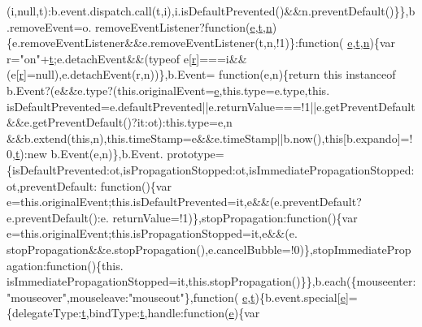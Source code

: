 \begin{DoxyCode}
{{      (i,null,t):b.event.dispatch.call(t,i),i.isDefaultPrevented()&&n.preventDefault()\}\},b.removeEvent=o.
      removeEventListener?\textcolor{keyword}{function}(\hyperlink{jquery-1_89_81_8min_8js_a2c038346d47955cbe2cb91e338edd7e1}{e},\hyperlink{jquery-1_89_81_8min_8js_a23c5666e83bbbceee94adcd0851f50c4}{t},\hyperlink{root_2static_2root_2js_2bootstrap_2jquery-ui-1_810_84_8custom_8min_8js_afc984c4f6c68ce30a0af99006f5f8d27}{n})\{e.removeEventListener&&e.removeEventListener(t,n,!1)\}:\textcolor{keyword}{function}(
      \hyperlink{jquery-1_89_81_8min_8js_a2c038346d47955cbe2cb91e338edd7e1}{e},\hyperlink{jquery-1_89_81_8min_8js_a23c5666e83bbbceee94adcd0851f50c4}{t},\hyperlink{root_2static_2root_2js_2bootstrap_2jquery-ui-1_810_84_8custom_8min_8js_afc984c4f6c68ce30a0af99006f5f8d27}{n})\{var r=\textcolor{stringliteral}{"on"}+\hyperlink{jquery-1_89_81_8min_8js_a23c5666e83bbbceee94adcd0851f50c4}{t};e.detachEvent&&(typeof e[\hyperlink{prism_8js_a514f1b439f404f86f77090fa9edc96ce}{r}]===i&&(e[\hyperlink{prism_8js_a514f1b439f404f86f77090fa9edc96ce}{r}]=null),e.detachEvent(r,n))\},b.Event=\textcolor{keyword}{
      function}(e,n)\{\textcolor{keywordflow}{return} \textcolor{keyword}{this} instanceof b.Event?(e&&e.type?(this.originalEvent=\hyperlink{jquery-1_89_81_8min_8js_a2c038346d47955cbe2cb91e338edd7e1}{e},this.type=e.type,this.
      isDefaultPrevented=e.defaultPrevented||e.returnValue===!1||e.getPreventDefault&&e.getPreventDefault()?it:ot):this.type=e,n
      &&b.extend(\textcolor{keyword}{this},n),this.timeStamp=e&&e.timeStamp||b.now(),\textcolor{keyword}{this}[b.expando]=!0,\hyperlink{jquery-1_89_81_8min_8js_a23c5666e83bbbceee94adcd0851f50c4}{t}):\textcolor{keyword}{new} b.Event(e,n)\},b.Event.
      prototype=\{isDefaultPrevented:ot,isPropagationStopped:ot,isImmediatePropagationStopped:ot,preventDefault:\textcolor{keyword}{
      function}()\{var e=this.originalEvent;this.isDefaultPrevented=it,e&&(e.preventDefault?e.preventDefault():e.
      returnValue=!1)\},stopPropagation:\textcolor{keyword}{function}()\{var e=this.originalEvent;this.isPropagationStopped=it,e&&(e.
      stopPropagation&&e.stopPropagation(),e.cancelBubble=!0)\},stopImmediatePropagation:\textcolor{keyword}{function}()\{this.
      isImmediatePropagationStopped=it,this.stopPropagation()\}\},b.each(\{mouseenter:\textcolor{stringliteral}{"mouseover"},mouseleave:\textcolor{stringliteral}{"mouseout"}\},\textcolor{keyword}{function}(
      \hyperlink{jquery-1_89_81_8min_8js_a2c038346d47955cbe2cb91e338edd7e1}{e},\hyperlink{jquery-1_89_81_8min_8js_a23c5666e83bbbceee94adcd0851f50c4}{t})\{b.event.special[\hyperlink{jquery-1_89_81_8min_8js_a2c038346d47955cbe2cb91e338edd7e1}{e}]=\{delegateType:\hyperlink{jquery-1_89_81_8min_8js_a23c5666e83bbbceee94adcd0851f50c4}{t},bindType:\hyperlink{jquery-1_89_81_8min_8js_a23c5666e83bbbceee94adcd0851f50c4}{t},handle:\textcolor{keyword}{function}(\hyperlink{jquery-1_89_81_8min_8js_a2c038346d47955cbe2cb91e338edd7e1}{e})\{var 
}}
\end{DoxyCode}
